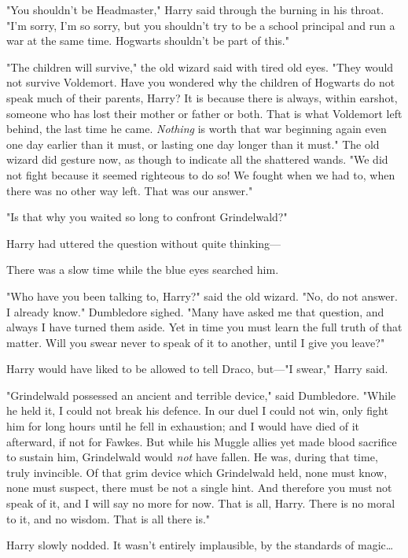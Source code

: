 "You shouldn't be Headmaster," Harry said through the burning in his throat.
"I'm sorry, I'm so sorry, but you shouldn't try to be a school principal and
run a war at the same time. Hogwarts shouldn't be part of this."

"The children will survive," the old wizard said with tired old eyes. "They
would not survive Voldemort. Have you wondered why the children of Hogwarts do
not speak much of their parents, Harry? It is because there is always, within
earshot, someone who has lost their mother or father or both. That is what
Voldemort left behind, the last time he came. \emph{Nothing} is worth that war
beginning again even one day earlier than it must, or lasting one day longer
than it must." The old wizard did gesture now, as though to indicate all the
shattered wands. "We did not fight because it seemed righteous to do so! We
fought when we had to, when there was no other way left. That was our answer."

"Is that why you waited so long to confront Grindelwald?"

Harry had uttered the question without quite thinking---

There was a slow time while the blue eyes searched him.

"Who have you been talking to, Harry?" said the old wizard. "No, do not answer.
I already know." Dumbledore sighed. "Many have asked me that question, and
always I have turned them aside. Yet in time you must learn the full truth of
that matter. Will you swear never to speak of it to another, until I give you
leave?"

Harry would have liked to be allowed to tell Draco, but---"I swear," Harry said.

"Grindelwald possessed an ancient and terrible device," said Dumbledore. "While
he held it, I could not break his defence. In our duel I could not win, only
fight him for long hours until he fell in exhaustion; and I would have died of
it afterward, if not for Fawkes. But while his Muggle allies yet made blood
sacrifice to sustain him, Grindelwald would \emph{not} have fallen. He was,
during that time, truly invincible. Of that grim device which Grindelwald held,
none must know, none must suspect, there must be not a single hint. And
therefore you must not speak of it, and I will say no more for now. That is
all, Harry. There is no moral to it, and no wisdom. That is all there is."

Harry slowly nodded. It wasn't entirely implausible, by the standards of
magic{\ldots}

